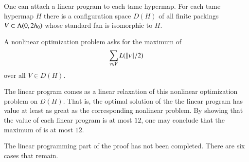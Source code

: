 One can attach a linear program to each tame hypermap.
For each tame hypermap $H$ there is a configuration space $D(H)$ of all
finite packings $V\subset \Lambda(0,2{h_0})$ whose standard fan is
isomorphic to $H$.

A nonlinear optimization problem asks for the maximum of
\begin{equation}\label{eqn:L2}
\sum_{v\in V} L({{\hskip0.1em|\hskip-0.15em|\hskip0.1em}v{\hskip0.1em|\hskip-0.15em|\hskip0.1em}}/2)
\end{equation}
over all $V\in D(H)$.

The linear program comes as a linear relaxation of this nonlinear
optimization problem on $D(H)$. That is, the optimal solution of the
the linear program has value at least as great as the corresponding
nonlinear problem.  By showing that the value of each linear program
is at most $12$, one may conclude that the maximum of 
is at most $12$.


\begin{note}%
The linear programming part of the proof has not been completed. There are six cases that remain.
\end{note}

